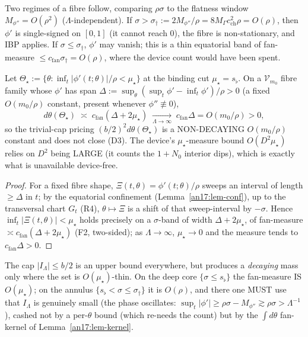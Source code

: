Two regimes of a fibre follow, comparing $\rho\sigma$ to the flatness window
$M_{\phi''}=O(\rho^2)$ ($\Lambda$-independent). If $\sigma>\sigma_\dagger:=
2M_{\phi''}/\rho=8M_\Gamma c_{\mathrm{ch}}^2\rho=O(\rho)$, then $\phi'$ is
single-signed on $[0,1]$ (it cannot reach $0$), the fibre is non-stationary, and
IBP applies. If $\sigma\le\sigma_\dagger$, $\phi'$ may vanish; this is a thin
equatorial band of fan-measure $\le c_{\mathrm{fan}}\sigma_\dagger=O(\rho)$, where
the device count would have been spent.

\begin{lemma}\label{an17:lem-capfails}
Let $\Theta_\star:=\{\theta:\inf_t|\phi'(t;\theta)|/\rho<\mu_\star\}$ at the
binding cut $\mu_\star=s_\flat$. On a $\mathcal V_{m_0}$ fibre family whose $\phi'$
has span $\Delta:=\sup_\theta(\sup_t\phi'-\inf_t\phi')/\rho>0$ (a fixed $O(m_0/
\rho)$ constant, present whenever $\phi''\not\equiv0$),
\begin{equation}\label{eq:an17-capfail}
 d\theta(\Theta_\star)\;\asymp\;c_{\mathrm{fan}}(\Delta+2\mu_\star)
 \;\xrightarrow[\Lambda\to\infty]{}\;c_{\mathrm{fan}}\Delta=O(m_0/\rho)>0,
\end{equation}
so the trivial-cap pricing $(b/2)^2d\theta(\Theta_\star)$ is a NON-DECAYING
$O(m_0/\rho)$ constant and does not close (D3). The device's $\mu_\star$-measure
bound $O(D^2\mu_\star)$ relies on $D^2$ being LARGE (it counts the
$1+N_0$ interior dips), which is exactly what is unavailable device-free.
\end{lemma}
\begin{proof}
For a fixed fibre shape, $\Xi(t,\theta)=\phi'(t;\theta)/\rho$ sweeps an interval
of length $\ge\Delta$ in $t$; by the equatorial confinement
(Lemma~\ref{an17:lem-conf}), up to the transversal chart $G_t$ (R4),
$\theta\mapsto\Xi$ is a shift of that sweep-interval by $-\sigma$. Hence
$\inf_t|\Xi(t,\theta)|<\mu_\star$ holds precisely on a $\sigma$-band of width
$\Delta+2\mu_\star$, of fan-measure $\asymp c_{\mathrm{fan}}(\Delta+2\mu_\star)$
(F2, two-sided); as $\Lambda\to\infty$, $\mu_\star\to0$ and the measure tends to
$c_{\mathrm{fan}}\Delta>0$.
\end{proof}

The cap $|I_\Lambda|\le b/2$ is an upper bound everywhere, but produces a
\emph{decaying} mass only where the set is $O(\mu_\star)$-thin. On the deep core
$\{\sigma\le s_\flat\}$ the fan-measure IS $O(\mu_\star)$; on the annulus
$\{s_\flat<\sigma\le\sigma_\dagger\}$ it is $O(\rho)$, and there one MUST use that
$I_\Lambda$ is genuinely small (the phase oscillates: $\sup_t|\phi'|\ge\rho\sigma-
M_{\phi''}\gtrsim\rho\sigma>\Lambda^{-1}$), cashed not by a per-$\theta$ bound
(which re-needs the count) but by the $\int d\theta$ fan-kernel of
Lemma~\ref{an17:lem-kernel}.

